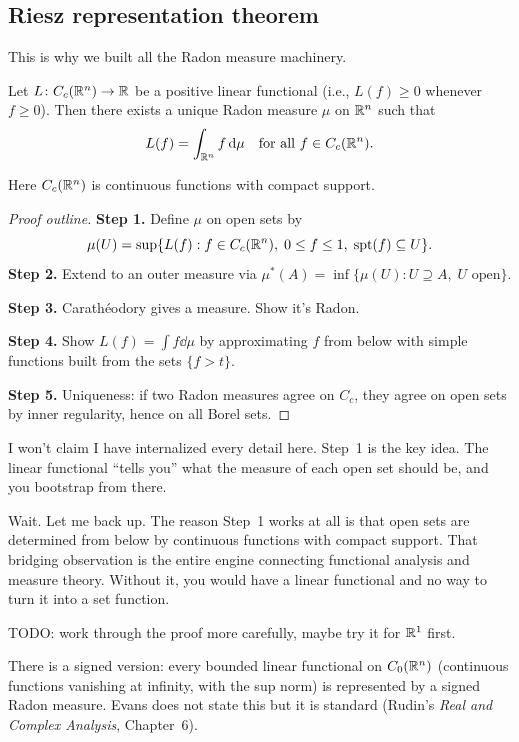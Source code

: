 \subsection{Riesz representation theorem}\label{subsec:riesz}

This is why we built all the Radon measure machinery.

\begin{theorem}\label{thm:riesz}
Let $L \colon C_c(\mathbb{R}^n) \to \mathbb{R}$ be a positive linear functional
(i.e., $L(f) \ge 0$ whenever $f \ge 0$). Then there exists a unique
Radon measure $\mu$ on $\mathbb{R}^n$ such that
\[
  L(f) = \int_{\mathbb{R}^n} f \,\mathrm{d}\mu \quad
    \text{for all } f \in C_c(\mathbb{R}^n).
\]
\end{theorem}

Here $C_c(\mathbb{R}^n)$ is continuous functions with compact support.

\begin{proof}[Proof outline]
\textbf{Step 1.} Define $\mu$ on open sets by
\[
  \mu(U) = \sup\{ L(f) : f \in C_c(\mathbb{R}^n),\; 0 \le f \le 1,\;
    \operatorname{spt}(f) \subseteq U \}.
\]
\textbf{Step 2.} Extend to an outer measure via
$\mu^*(A) = \inf\{ \mu(U) : U \supseteq A,\; U \text{ open} \}$.

\textbf{Step 3.} Carath\'eodory gives a measure. Show it's Radon.

\textbf{Step 4.} Show $L(f) = \int f \dd\mu$ by approximating $f$ from
below with simple functions built from the sets $\{f > t\}$.

\textbf{Step 5.} Uniqueness: if two Radon measures agree on $C_c$, they
agree on open sets by inner regularity, hence on all Borel sets.
\end{proof}

I won't claim I have internalized every detail here. Step~1 is the key idea. The linear functional ``tells you'' what the measure of
each open set should be, and you bootstrap from there.

Wait. Let me back up. The reason Step~1 works at all is that open sets are determined from below
by continuous functions with compact support. That bridging observation is the entire engine connecting functional analysis and measure theory. Without it, you would have a linear functional and no way to turn it into a set function.

TODO: work through the proof more carefully, maybe try it for $\mathbb{R}^1$
first.

\begin{remark}\label{rem:riesz-signed}
There is a signed version: every bounded linear functional on $C_0(\mathbb{R}^n)$
(continuous functions vanishing at infinity, with the sup norm) is
represented by a signed Radon measure. Evans does not state this but it is
standard (Rudin's \emph{Real and Complex Analysis}, Chapter~6).
\end{remark}


